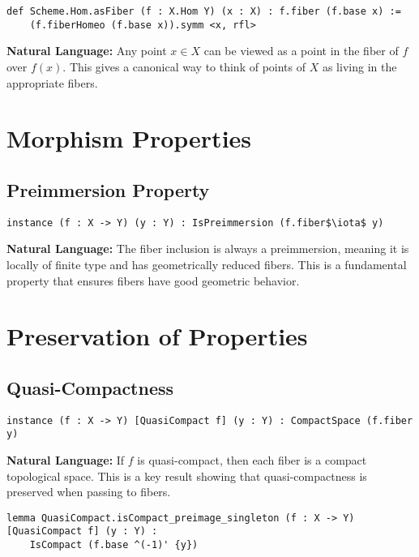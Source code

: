 \documentclass{article}
\theoremstyle{definition}
\begin{document}
\begin{lstlisting}
def Scheme.Hom.asFiber (f : X.Hom Y) (x : X) : f.fiber (f.base x) :=
    (f.fiberHomeo (f.base x)).symm <x, rfl>
\end{lstlisting}

\textbf{Natural Language:} Any point $x \in X$ can be viewed as a point in the fiber of $f$ over $f(x)$. This gives a canonical way to think of points of $X$ as living in the appropriate fibers.

\section{Morphism Properties}

\subsection{Preimmersion Property}

\begin{lstlisting}
instance (f : X -> Y) (y : Y) : IsPreimmersion (f.fiber$\iota$ y)
\end{lstlisting}

\textbf{Natural Language:} The fiber inclusion is always a preimmersion, meaning it is locally of finite type and has geometrically reduced fibers. This is a fundamental property that ensures fibers have good geometric behavior.

\section{Preservation of Properties}

\subsection{Quasi-Compactness}

\begin{lstlisting}
instance (f : X -> Y) [QuasiCompact f] (y : Y) : CompactSpace (f.fiber y)
\end{lstlisting}

\textbf{Natural Language:} If $f$ is quasi-compact, then each fiber is a compact topological space. This is a key result showing that quasi-compactness is preserved when passing to fibers.

\begin{lstlisting}
lemma QuasiCompact.isCompact_preimage_singleton (f : X -> Y) [QuasiCompact f] (y : Y) :
    IsCompact (f.base ^(-1)' {y})
\end{lstlisting}
\end{document}
